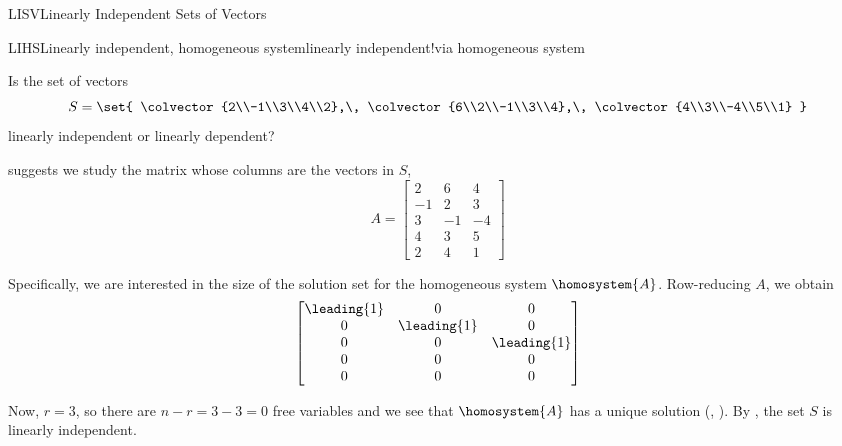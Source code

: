 \begin{subsect}{LISV}{Linearly Independent Sets of Vectors}
%
\begin{example}{LIHS}{Linearly independent, homogeneous system}{linearly independent!via homogeneous system}
\begin{para}Is the set of vectors
%
\begin{equation*}
S=\set{
\colvector{2\\-1\\3\\4\\2},\,
\colvector{6\\2\\-1\\3\\4},\,
\colvector{4\\3\\-4\\5\\1}
}
\end{equation*}
%
linearly independent or linearly dependent?\end{para}
%
\begin{para} suggests we study the matrix whose columns are the vectors in $S$,
%
\begin{equation*}
A=
\begin{bmatrix}
2 & 6 & 4\\
-1 & 2 & 3\\
3 & -1 & -4\\
4 & 3 & 5\\
2 & 4 & 1
\end{bmatrix}
\end{equation*}
\end{para}
%
\begin{para}Specifically, we are interested in the size of the solution set for the homogeneous system $\homosystem{A}$.  Row-reducing $A$, we obtain
%
\begin{equation*}
\begin{bmatrix}
\leading{1} & 0 & 0\\
0 & \leading{1} & 0\\
0 & 0 & \leading{1}\\
0 & 0 & 0\\
0 & 0 & 0
\end{bmatrix}
\end{equation*}
\end{para}
%
\begin{para}Now, $r=3$, so there are $n-r=3-3=0$ free variables and we see that $\homosystem{A}$ has a unique solution  (, ).  By , the set $S$ is linearly independent.

\end{para}
\end{example}
\end{subsect}
